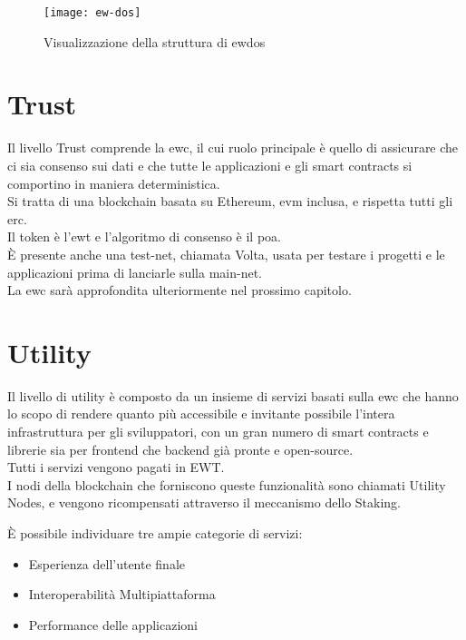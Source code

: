 \begin{figure}[h]
    \texttt{[image: ew-dos]}
    \centering
    \caption{Visualizzazione della struttura di \gls{ewdos} \cite{img:ew-dos}}
    \label{lab:ew-dos}
\end{figure}

\section{Trust}
Il livello Trust comprende la \gls{ewc}, il cui ruolo principale è quello di assicurare che ci sia consenso sui dati e che tutte le applicazioni e gli smart contracts si comportino in maniera deterministica.\\
Si tratta di una blockchain basata su Ethereum, \gls{evm} inclusa, e rispetta tutti gli \gls{erc}. \\
Il token è l'\gls{ewt} e l'algoritmo di consenso è il \gls{poa}. \\
È presente anche una test-net, chiamata Volta, usata per testare i progetti e le applicazioni prima di lanciarle sulla main-net. \\
La \gls{ewc} sarà approfondita ulteriormente nel prossimo capitolo.

\section{Utility}
Il livello di utility è composto da un insieme di servizi basati sulla \gls{ewc} che hanno lo scopo di rendere quanto più accessibile e invitante possibile l'intera infrastruttura per gli sviluppatori,
con un gran numero di smart contracts e librerie sia per frontend che backend già pronte e open-source. \cite{art:ew-dos} \\
Tutti i servizi vengono pagati in EWT. \\
I nodi della blockchain che forniscono queste funzionalità sono chiamati Utility Nodes, e vengono ricompensati attraverso il meccanismo dello Staking.

È possibile individuare tre ampie categorie di servizi:
\begin{itemize}
    \item Esperienza dell'utente finale
    \item Interoperabilità Multipiattaforma
    \item Performance delle applicazioni
\end{itemize}

